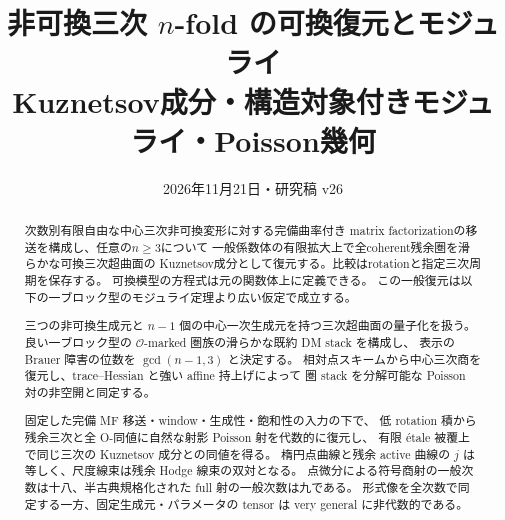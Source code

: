 \documentclass[11pt,a4paper]{ltjsarticle}
\title{非可換三次 $n$-fold の可換復元とモジュライ\\
\large Kuznetsov成分・構造対象付きモジュライ・Poisson幾何}
\author{}
\date{2026年11月21日・研究稿 v26}
\numberwithin{equation}{section}
\begin{document}
\maketitle
\vspace{-1.8\baselineskip}
\begin{abstract}
次数別有限自由な中心三次非可換変形に対する完備曲率付き
matrix factorizationの移送を構成し、任意の$n\ge3$について
一般係数体の有限拡大上で全coherent残余圏を滑らかな可換三次超曲面の
Kuznetsov成分として復元する。比較はrotationと指定三次周期を保存する。
可換模型の方程式は元の関数体上に定義できる。
この一般復元は以下の一ブロック型のモジュライ定理より広い仮定で成立する。

三つの非可換生成元と $n-1$ 個の中心一次生成元を持つ三次超曲面の量子化を扱う。
良い一ブロック型の $\mathcal O$-marked 圏族の滑らかな既約 DM stack を構成し、
表示の Brauer 障害の位数を $\gcd(n-1,3)$ と決定する。
相対点スキームから中心三次商を復元し、trace--Hessian と強い affine 持上げによって
圏 stack を分解可能な Poisson 対の非空開と同定する。

固定した完備 MF 移送・window・生成性・飽和性の入力の下で、
低 rotation 積から残余三次と全 O-同値に自然な射影 Poisson 射を代数的に復元し、
有限 \'etale 被覆上で同じ三次の Kuznetsov 成分との同値を得る。
楕円点曲線と残余 active 曲線の $j$ は等しく、尺度線束は残余 Hodge 線束の双対となる。
点微分による符号商射の一般次数は十八、半古典規格化された full 射の一般次数は九である。
形式像を全次数で同定する一方、固定生成元・パラメータの tensor は very general に非代数的である。


\end{abstract}
\end{document}
